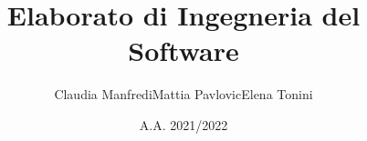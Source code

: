 \usepackage[utf8]{inputenc}
\usepackage{pgfpages}
\usepackage{graphicx}
\usepackage{amsmath}
\usepackage{hyperref}

\title[Ingegneria Del Software]{Elaborato di Ingegneria del Software}
\author[Claudia Manfredi, Mattia Pavlovic, Elena Tonini]{Claudia Manfredi\newline Mattia Pavlovic\newline Elena Tonini}
\date{A.A. 2021/2022}


\graphicspath{{images/}}


%
%
%

